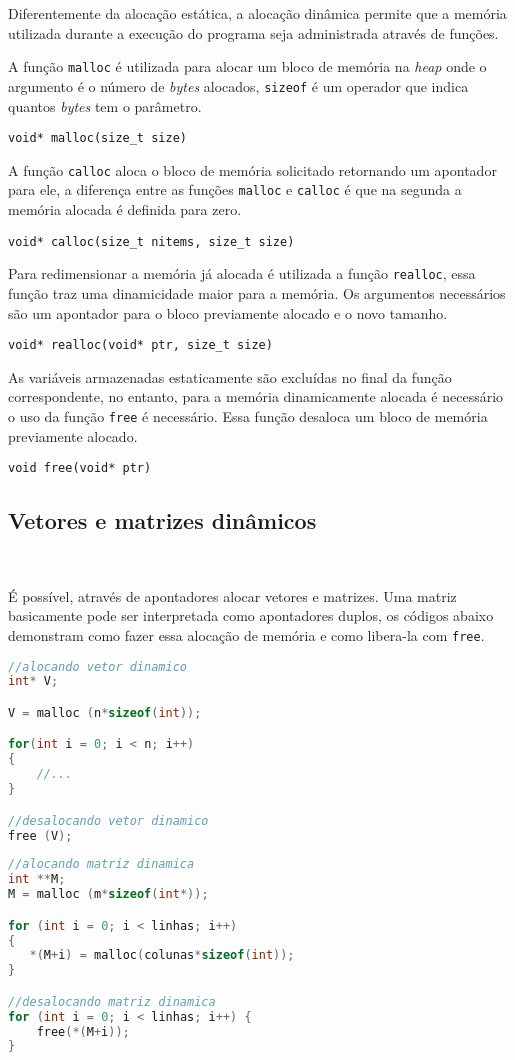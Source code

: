 Diferentemente da alocação estática, a alocação dinâmica permite que a memória utilizada durante a execução do programa seja administrada através de funções.

A função \texttt{malloc} é utilizada para alocar um bloco de memória na \textit{heap} onde o argumento é o número de \textit{bytes} alocados, \texttt{sizeof} é um operador que indica quantos \textit{bytes} tem o parâmetro.

\begin{center}
\texttt{void* malloc(size\_t size)}
\end{center}

A função \texttt{calloc} aloca o bloco de memória solicitado retornando um apontador para ele, a diferença entre as funções \texttt{malloc} e \texttt{calloc} é que na segunda a memória alocada é definida para zero.

\begin{center}
\texttt{void* calloc(size\_t nitems, size\_t size)}
\end{center}

Para redimensionar a memória já alocada é utilizada a função \texttt{realloc}, essa função traz uma dinamicidade maior para a memória. Os argumentos necessários são um apontador para o bloco previamente alocado e o novo tamanho.

\begin{center}
\texttt{void* realloc(void* ptr, size\_t size)}
\end{center}

As variáveis armazenadas estaticamente são excluídas no final da função correspondente, no entanto, para a memória dinamicamente alocada é necessário o uso da função \texttt{free} é necessário. Essa função desaloca um bloco de memória previamente alocado.

\begin{center}
\texttt{void free(void* ptr)}
\end{center}

\subsection*{Vetores e matrizes dinâmicos}
\

É possível, através de apontadores alocar vetores e matrizes. Uma matriz basicamente pode ser interpretada como apontadores duplos, os códigos abaixo demonstram como fazer essa alocação de memória e como libera-la com \texttt{free}.

\begin{lstlisting}[language=C, frame=single]
//alocando vetor dinamico
int* V; 

V = malloc (n*sizeof(int));

for(int i = 0; i < n; i++)
{
    //...
}

//desalocando vetor dinamico
free (V);
\end{lstlisting}

\begin{lstlisting}[language=C, frame=single]
//alocando matriz dinamica
int **M; 
M = malloc (m*sizeof(int*));

for (int i = 0; i < linhas; i++)
{
   *(M+i) = malloc(colunas*sizeof(int));
}

//desalocando matriz dinamica
for (int i = 0; i < linhas; i++) {
    free(*(M+i));
}

\end{lstlisting}